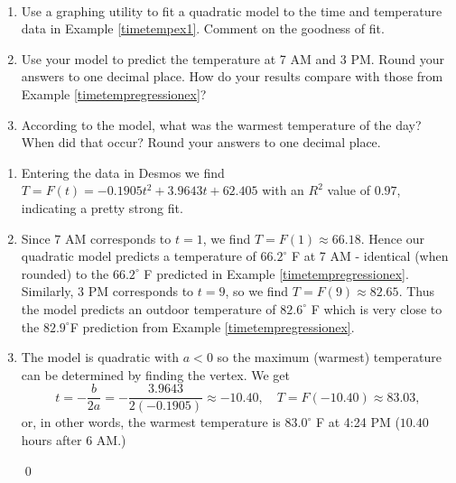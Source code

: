 \documentclass{ximera}
\begin{document}
\begin{example} \label{TimeTempQRex} $~$

\begin{enumerate}

\item Use a graphing utility to fit a quadratic model to the time and temperature data in Example \ref{timetempex1}.  Comment on the goodness of fit.  

\item  Use your model to predict the temperature at 7 AM and 3 PM.  Round your answers to one decimal place.  How do your results compare with those from Example \ref{timetempregressionex}?

\item  According to the model, what was the warmest temperature of the day?  When did that occur?  Round your answers to one decimal place.

\end{enumerate}

\begin{explanation}

\begin{enumerate}

\item Entering the data in Desmos we find  $T = F(t)  = -0.1905t^2+ 3.9643t+62.405$ with an $R^2$ value of $0.97$, indicating a pretty strong fit.  

\begin{center}
 \end{center}
 

\item Since $7$ AM corresponds to $t=1$, we find $T = F(1) \approx 66.18$.   Hence our quadratic model predicts a temperature of  $66.2^{\circ}$ F at 7 AM - identical (when rounded) to the  $66.2^{\circ}$ F predicted in Example \ref{timetempregressionex}.  Similarly, $3$ PM corresponds to $t = 9$, so we find  $T = F(9) \approx 82.65$.  Thus the model predicts an outdoor temperature of $82.6^{\circ}$ F which is very close to the $82.9^{\circ}$F prediction from Example \ref{timetempregressionex}.

\item The model is quadratic with $a<0$ so the maximum (warmest) temperature can be determined by finding the vertex.  We get \[ t = -\frac{b}{2a} = - \frac{3.9643}{2( -0.1905)}  \approx -10.40, \quad T = F(-10.40) \approx 83.03,\] or, in other words, the warmest temperature is $83.0^{\circ}$ F at 4:24 PM ($10.40$ hours after 6 AM.)


 \qed
 
 \end{enumerate}
\end{explanation}
 \end{example}
\end{document}
